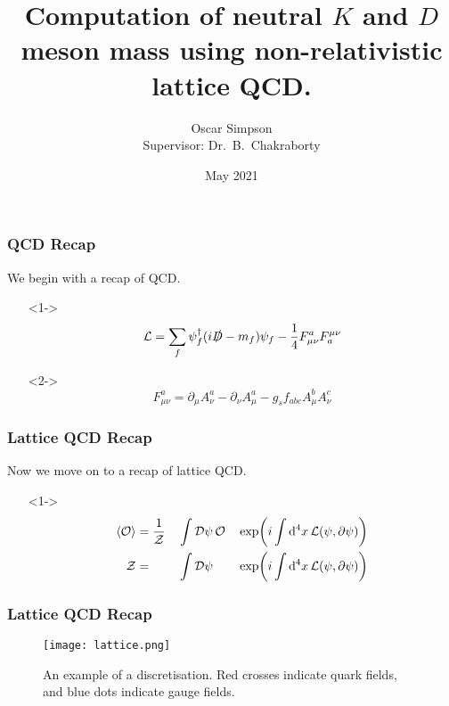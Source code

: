 \documentclass{beamer}
\title[Meson calculations using NRQCD]{Computation of neutral $K$ and $D$ meson mass using non-relativistic lattice QCD.}
\author[Oscar Simpson]{Oscar Simpson \\ Supervisor: Dr.\ B.\ Chakraborty}
\date{May 2021}
\begin{document}
\frame{\titlepage}


\begin{frame}
\frametitle{QCD Recap}
We begin with a recap of QCD\cite{2010QFT, 2015Colquhoun}.
\begin{itemize}
    \item[]<1-> 
    \begin{equation*}
    \mathcal{L} = \sum_f \psi^\dagger_f (i\slashed{D}-m_f) \psi_f - \frac{1}{4}F^a_{\mu\nu} F^{\mu\nu}_a
    \end{equation*}
    
    \item[]<2->
    \begin{equation*}
    F^a_{\mu\nu} = \partial_\mu A_\nu^a - \partial_\nu A_\mu^a - g_s f_{abc} A_\mu^b A_\nu^c
    \end{equation*}
\end{itemize}
\end{frame}

\begin{frame}
\frametitle{Lattice QCD Recap}
Now we move on to a recap of lattice QCD\cite{1948Feynman, 2015Colquhoun}.
\begin{itemize}
    \item[]<1->
    \begin{alignat*}{3}
    \expval{\mathcal{O}} &= \dfrac{1}{\mathcal{Z}}&&\int\mathinner{\operatorname{\mathrm{\mathcal{D}}}\!\psi} \mathcal{O}  &&\exp(i \int \dd[4]{x} \mathcal{L}(\psi, \partial \psi)) \\
    \mathcal{Z}          &=                       &&\int\mathinner{\operatorname{\mathrm{\mathcal{D}}}\!\psi}              &&\exp(i \int \dd[4]{x} \mathcal{L}(\psi, \partial \psi))
    \end{alignat*}

\end{itemize}
    
\end{frame}

\begin{frame}
\frametitle{Lattice QCD Recap}
\begin{figure}
    \centering
    \texttt{[image: lattice.png]}
    \caption{An example of a discretisation. Red crosses indicate quark fields, and blue dots indicate gauge fields.}
\end{figure}
\end{frame}
\end{document}
